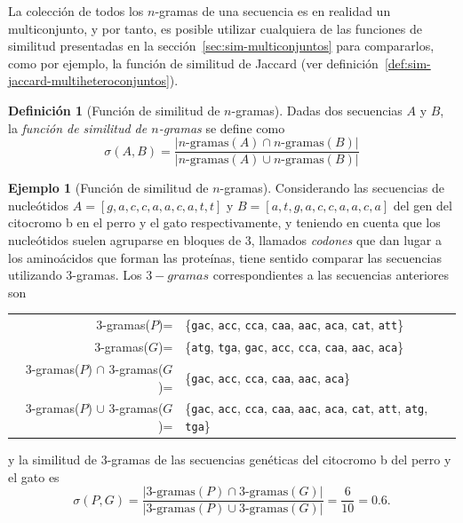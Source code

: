 \documentclass[a4paper,10pt,twoside]{article}
\theoremstyle{definition}
\newtheorem{definition}{Definición}
\newtheorem{example}{Ejemplo}
\begin{document}
La colección de todos los $n$-gramas de una secuencia es en realidad un multiconjunto, y por tanto, es posible utilizar cualquiera de las funciones de similitud presentadas en la sección~\ref{sec:sim-multiconjuntos} para
compararlos,  como por ejemplo, la función de similitud de Jaccard (ver
definición~\ref{def:sim-jaccard-multiheteroconjuntos}).

\begin{definition}[Función de similitud de $n$-gramas]
Dadas dos secuencias $A$ y $B$, la \emph{función de similitud de $n$-gramas} se define como
\[
\sigma(A,B)=\frac{|n\textrm{-gramas}(A)\cap n\textrm{-gramas}(B)|}{|n\textrm{-gramas}(A)\cup n\textrm{-gramas}(B)|}
\]
\end{definition}

\begin{example}[Función de similitud de $n$-gramas]
Considerando las secuencias de nucleótidos $A=[g,a,c,c,a,a,c,a,t,t]$ y $B=[a,t,g,a,c,c,a,a,c,a]$ del gen del citocromo b en el perro y el gato respectivamente, y teniendo en cuenta que los nucleótidos suelen agruparse en bloques de 3, llamados \emph{codones} que dan lugar a
los aminoácidos que forman las proteínas, tiene sentido comparar las secuencias utilizando 3-gramas.
Los $3-gramas$ correspondientes a las secuencias anteriores son
\begin{center}
\begin{tabular}{rl}
3-gramas($P$)= & \{\texttt{gac}, \texttt{acc}, \texttt{cca}, \texttt{caa}, \texttt{aac}, \texttt{aca}, \texttt{cat},
\texttt{att}\}\\
3-gramas($G$)= & \{\texttt{atg}, \texttt{tga}, \texttt{gac}, \texttt{acc}, \texttt{cca}, \texttt{caa}, \texttt{aac},
\texttt{aca}\}\\ 
3-gramas($P$) $\cap$ 3-gramas($G$)= & \{\texttt{gac}, \texttt{acc}, \texttt{cca}, \texttt{caa}, \texttt{aac},
\texttt{aca}\}\\
3-gramas($P$) $\cup$ 3-gramas($G$)= & \{\texttt{gac}, \texttt{acc}, \texttt{cca}, \texttt{caa}, \texttt{aac},
\texttt{aca}, \texttt{cat}, \texttt{att}, \texttt{atg}, \texttt{tga}\}\\
\end{tabular} 
\end{center}

y la similitud de $3$-gramas de las secuencias genéticas del citocromo b del perro y el gato es
\[
\sigma(P,G)=\frac{|\textrm{3-gramas}(P)\cap \textrm{3-gramas}(G)|}{|\textrm{3-gramas}(P)\cup \textrm{3-gramas}(G)|} =
\frac{6}{10}=0.6.
\]
\end{example}
\end{document}
